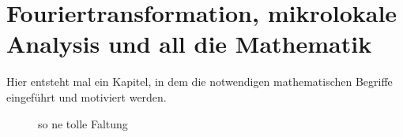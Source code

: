 
\section{Fouriertransformation, mikrolokale Analysis und all die Mathematik} %
\label{sec:fouriertransformation_mikrolokale_analysis_und_all_die_mathematik}

Hier entsteht mal ein Kapitel, in dem die notwendigen mathematischen Begriffe eingeführt und motiviert werden.


\begin{definition}[Wellenfrontmenge]
\label{def:wavefrontset}
\end{definition}

\begin{figure}
\caption{so ne tolle Faltung}
\label{fig:faltung_strahlen}
\end{figure}

